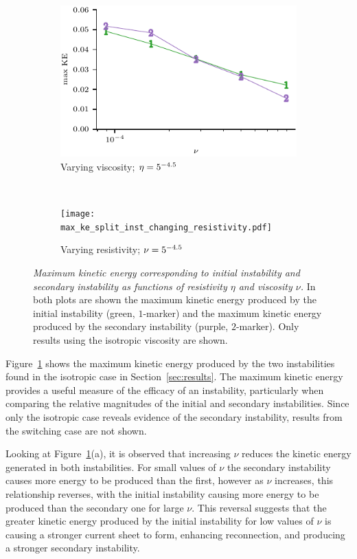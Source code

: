 \begin{figure}[t]
    \centering
    \begin{subfigure}[t]{0.5\textwidth}
      \includegraphics[width=\textwidth]{max_ke_split_inst_changing_viscosity.pdf}
      \caption{Varying viscosity; $\eta = 5\time 10^{-4.5}$}
    \end{subfigure}%
    ~
    \begin{subfigure}[t]{0.5\textwidth}
      \texttt{[image: max\_ke\_split\_inst\_changing\_resistivity.pdf]}
      \caption{Varying resistivity; $\nu = 5\time 10^{-4.5}$}
    \end{subfigure}
    \caption{\textit{Maximum kinetic energy corresponding to initial instability and secondary instability as functions of resistivity $\eta$ and viscosity $\nu$.} In both plots are shown the maximum kinetic energy produced by the initial instability (green, $1$-marker) and the maximum kinetic energy produced by the secondary instability (purple, $2$-marker). Only results using the isotropic viscosity are shown.}
    \label{fig:secondary_instability}
\end{figure}

Figure~\ref{fig:secondary_instability} shows the maximum kinetic energy produced by the two instabilities found in the isotropic case in Section~\ref{sec:results}. The maximum kinetic energy provides a useful measure of the efficacy of an instability, particularly when comparing the relative magnitudes of the initial and secondary instabilities. Since only the isotropic case reveals evidence of the secondary instability, results from the switching case are not shown.

Looking at Figure~\ref{fig:secondary_instability}(a), it is observed that increasing $\nu$ reduces the kinetic energy generated in both instabilities. For small values of $\nu$ the secondary instability causes more energy to be produced than the first, however as $\nu$ increases, this relationship reverses, with the initial instability causing more energy to be produced than the secondary one for large $\nu$. This reversal suggests that the greater kinetic energy produced by the initial instability for low values of $\nu$ is causing a stronger current sheet to form, enhancing reconnection, and producing a stronger secondary instability.

